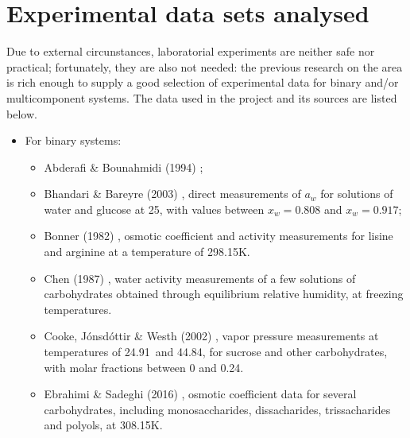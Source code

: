 \chapter{Experimental data sets analysed}

\label{sec_selec_data}

Due to external circunstances, laboratorial experiments are neither safe nor
practical; fortunately, they are also not needed: the previous research on the
area is rich enough to supply a good selection of experimental data for binary
and/or multicomponent systems. The data used in the project and its sources are
listed below.

\begin{itemize}
	\item For binary systems:
		\begin{itemize}
			\item Abderafi \& Bounahmidi (1994) \cite{abderafi1994};
			\item Bhandari \& Bareyre (2003) \cite{bhandari2003},
				direct measurements of $a_w$ for solutions of water
				and glucose at 25\textcelsius, with values between
				$x_w = 0.808$ and $x_w = 0.917$;
			\item Bonner (1982) \cite{bonner1982}, osmotic coefficient
				and activity measurements for lisine
				and arginine at a temperature of 298.15K.
			\item Chen (1987) \cite{chen1987}, water activity
				measurements of a few solutions of carbohydrates
				obtained through equilibrium relative humidity, at
				freezing temperatures.
			\item Cooke, Jónsdóttir \& Westh (2002) \cite{cooke2002a},
				vapor pressure measurements at temperatures of
				24.91\textcelsius\ and 44.84\textcelsius, for
				sucrose and other carbohydrates, with molar fractions
				between 0 and 0.24.
			\item Ebrahimi \& Sadeghi (2016) \cite{ebrahimi2016},
				osmotic coefficient data for several carbohydrates,
				including monosaccharides, dissacharides,
				trissacharides and polyols, at 308.15K.

\end{itemize}
\end{itemize}
